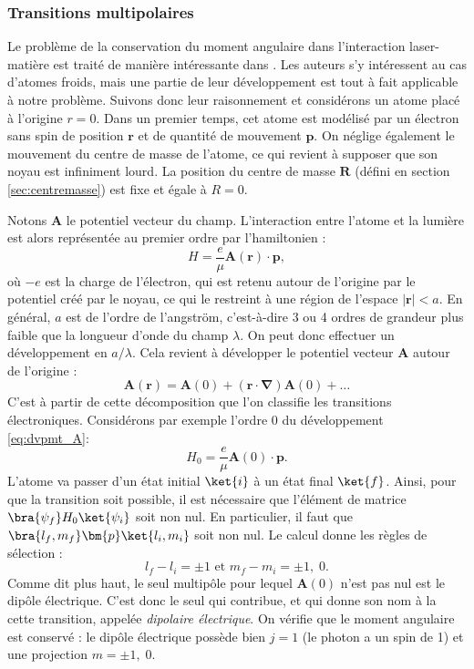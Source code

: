 \subsubsection{Transitions multipolaires}
Le problème de la conservation du moment angulaire dans l'interaction laser-matière est traité de manière intéressante dans . Les auteurs s'y intéressent au cas d'atomes froids, mais une partie de leur développement est tout à fait applicable à notre problème. Suivons donc leur raisonnement et considérons un atome placé à l'origine $r=0$. Dans un premier temps, cet atome est modélisé par un électron sans spin de position $\bm{r}$ et de quantité de mouvement $\bm{p}$. On néglige également le mouvement du centre de masse de l'atome, ce qui revient à supposer que son noyau est infiniment lourd. La position du centre de masse $\bm{R}$ (défini en section \ref{sec:centremasse}) est fixe et égale à $R=0$.\par 
Notons $\bm{A}$ le potentiel vecteur du champ. L'interaction entre l'atome et la lumière est alors représentée au premier ordre par l'hamiltonien :
\begin{equation*}
H = \frac{e}{\mu}\bm{A}(\bm{r})\cdot\bm{p},
\end{equation*}
où $-e$ est la charge de l'électron, qui est retenu autour de l'origine par le potentiel créé par le noyau, ce qui le restreint à une région de l'espace $\left|\bm{r}\right|<a$. En général, $a$ est de l'ordre de l'angström, c'est-à-dire 3 ou 4 ordres de grandeur plus faible que la longueur d'onde du champ $\lambda$. On peut donc effectuer un développement en $a/\lambda$. Cela revient à développer le potentiel vecteur $\bm{A}$ autour de l'origine :
\begin{equation}
\bm{A}(\bm{r}) = \bm{A}(0)+(\bm{r}\cdot\bm{\nabla})\bm{A}(0)+\ldots
\label{eq:dvpmt_A}
\end{equation}
C'est à partir de cette décomposition que l'on classifie les transitions électroniques. Considérons par exemple l'ordre 0 du développement \ref{eq:dvpmt_A}:
\begin{equation*}
H_0 = \frac{e}{\mu}\bm{A}(0)\cdot\bm{p}.
\end{equation*}
L'atome va passer d'un état initial $\ket{i}$ à un état final $\ket{f}$. Ainsi, pour que la transition soit possible, il est nécessaire que l'élément de matrice $\bra{\psi_f}H_0\ket{\psi_i}$ soit non nul. En particulier, il faut que $\bra{l_f,m_f}\bm{p}\ket{l_i,m_i}$ soit non nul. Le calcul donne les règles de sélection  :
\begin{equation*}
l_f-l_i=\pm1\text{ et }m_f-m_i=\pm1,\;0.
\end{equation*}
Comme dit plus haut, le seul multipôle pour lequel $\bm{A}(0)$ n'est pas nul est le dipôle électrique. C'est donc le seul qui contribue, et qui donne son nom à la cette transition, appelée \textit{dipolaire électrique}. On vérifie que le moment angulaire est conservé : le dipôle électrique possède bien $j=1$ (le photon a un spin de 1) et une projection $m=\pm1,\;0$.

